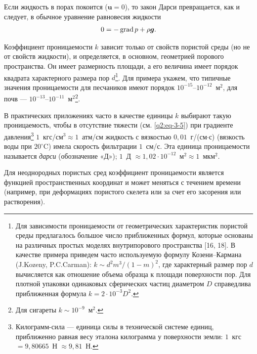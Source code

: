 Если жидкость в порах покоится ($\boldsymbol{u}=0$), то закон Дарси превращается, как и следует, в обычное уравнение равновесия жидкости
\[
0=-\operatorname{grad} p+\rho\boldsymbol{g}.
\]

\setcounter{footnote}{0}
Коэффициент проницаемости $k$ зависит только от свойств пористой среды (но не от свойств жидкости), и определяется, в основном, геометрией порового пространства. Он имеет размерность площади, а его величина имеет порядок квадрата характерного размера пор $d$\footnote{Для зависимости проницаемости от геометрических характеристик пористой среды предлагалось большое число приближенных формул, которые основаны на различных простых моделях внутрипорового пространства [16, 18]. В качестве примера приведем часто используемую формулу Козени--Кармана (J.Kozeny, P.C.Carman): $k\sim d^2m^3/(1-m)^2$, где характерный размер пор $d$ вычисляется как отношение объема образца к площади поверхности пор. Для плотной упаковки одинаковых сферических частиц диаметром $D$ справедлива приближенная формула $k=2\cdot10^{-3}D^2$.}. Для примера укажем, что типичные значения проницаемости для песчаников имеют порядок $10^{-15}$--$10^{-12}$~м$^2$, для почв --- $10^{-13}$--$10^{-11}$~м$^2$\footnote{Для сигареты $k\sim10^{-9}$~м$^2$.}.

В практических приложениях часто в качестве единицы $k$ выбирают такую проницаемость, чтобы в отсутствие тяжести (см. \eqref{q2:eq-3-5}) при градиенте давления\footnote{Килограмм-сила --- единица силы в технической системе единиц, приближенно равная весу эталона килограмма у поверхности земли: $1$~кгс $=9{,}80665$~Н $\approx9{,}81$~Н.} $1$~кгс/см$^3\approx1$~атм/см жидкость с вязкостью $0{,}01$~г/(см$\cdot$с) (вязкость воды при $20^\circ$C) имела скорость фильтрации $1$~см/с. Эта единица проницаемости называется \textit{дарси} (обозначение «Д»); $1$~Д $\approx1{,}02\cdot10^{-12}$~м$^2\approx1$~мкм$^2$.

Для неоднородных пористых сред коэффициент проницаемости является функцией пространственных координат и может меняться с течением времени (например, при деформациях пористого скелета или за счет его засорения или растворения).

